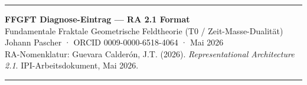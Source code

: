 \vspace{0.6em}\hrule\vspace{0.5em}

\begin{center}
{\large\bfseries FFGFT Diagnose-Eintrag — RA 2.1 Format}\\[0.2em]
{\normalsize Fundamentale Fraktale Geometrische Feldtheorie (T0 / Zeit-Masse-Dualität)}\\[0.1em]
{\small Johann Pascher · ORCID 0009-0000-6518-4064 · Mai 2026}\\[0.1em]
{\footnotesize RA-Nomenklatur: Guevara Calderón, J.T. (2026). \textit{Representational Architecture 2.1}. IPI-Arbeitsdokument, Mai 2026.}
\end{center}

\vspace{0.3em}\hrule\vspace{0.3em}

